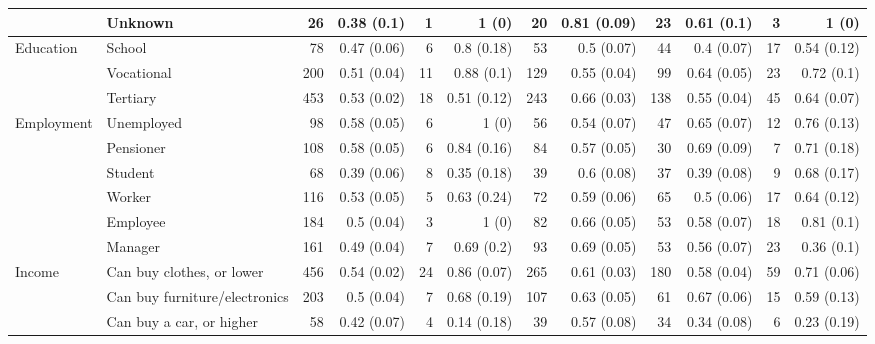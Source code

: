 \begin{tabular}{llrrrrrrrrrr}
	& Unknown & 26 & 0.38 (0.1) & 1 & 1 (0) & 20 & 0.81 (0.09) & 23 & 0.61 (0.1) & 3 & 1 (0) \\ 
	\midrule
	Education & School & 78 & 0.47 (0.06) & 6 & 0.8 (0.18) & 53 & 0.5 (0.07) & 44 & 0.4 (0.07) & 17 & 0.54 (0.12) \\ 
	& Vocational & 200 & 0.51 (0.04) & 11 & 0.88 (0.1) & 129 & 0.55 (0.04) & 99 & 0.64 (0.05) & 23 & 0.72 (0.1) \\ 
	& Tertiary & 453 & 0.53 (0.02) & 18 & 0.51 (0.12) & 243 & 0.66 (0.03) & 138 & 0.55 (0.04) & 45 & 0.64 (0.07) \\
	\midrule
	Employment & Unemployed & 98 & 0.58 (0.05) & 6 & 1 (0) & 56 & 0.54 (0.07) & 47 & 0.65 (0.07) & 12 & 0.76 (0.13) \\ 
	& Pensioner & 108 & 0.58 (0.05) & 6 & 0.84 (0.16) & 84 & 0.57 (0.05) & 30 & 0.69 (0.09) & 7 & 0.71 (0.18) \\ 
	& Student & 68 & 0.39 (0.06) & 8 & 0.35 (0.18) & 39 & 0.6 (0.08) & 37 & 0.39 (0.08) & 9 & 0.68 (0.17) \\ 
	& Worker & 116 & 0.53 (0.05) & 5 & 0.63 (0.24) & 72 & 0.59 (0.06) & 65 & 0.5 (0.06) & 17 & 0.64 (0.12) \\ 
	& Employee & 184 & 0.5 (0.04) & 3 & 1 (0) & 82 & 0.66 (0.05) & 53 & 0.58 (0.07) & 18 & 0.81 (0.1) \\ 
	& Manager & 161 & 0.49 (0.04) & 7 & 0.69 (0.2) & 93 & 0.69 (0.05) & 53 & 0.56 (0.07) & 23 & 0.36 (0.1) \\ 
	\midrule
	Income & Can buy clothes, or lower & 456 & 0.54 (0.02) & 24 & 0.86 (0.07) & 265 & 0.61 (0.03) & 180 & 0.58 (0.04) & 59 & 0.71 (0.06) \\ 
	& Can buy furniture/electronics & 203 & 0.5 (0.04) & 7 & 0.68 (0.19) & 107 & 0.63 (0.05) & 61 & 0.67 (0.06) & 15 & 0.59 (0.13) \\ 
	& Can buy a car, or higher & 58 & 0.42 (0.07) & 4 & 0.14 (0.18) & 39 & 0.57 (0.08) & 34 & 0.34 (0.08) & 6 & 0.23 (0.19) \\ 
	\bottomrule
\end{tabular}